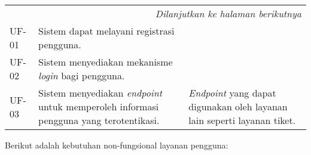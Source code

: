 \begin{longtable}{|l|p{}|p{}|}
    \hline
    \multicolumn{3}{|r|}{\textit{Dilanjutkan ke halaman berikutnya}}                                                                                                                                                                                                                                                                                                                                                                                                                                                                                                                                      \\
    \endfoot

    \hline
    \endlastfoot

    \hline
    UF-01       & Sistem dapat melayani registrasi pengguna.                                                                                                                                                                                      &                                                                                                                                                                                                                                                                                                                                                       \\
    \hline
    UF-02       & Sistem menyediakan mekanisme \textit{login} bagi pengguna.                                                                                                                                                                      &                                                                                                                                                                                                                                                                                                                                                       \\
    \hline
    UF-03       & Sistem menyediakan \textit{endpoint} untuk memperoleh informasi pengguna yang terotentikasi.                                                                                                                  & \textit{Endpoint} yang dapat digunakan oleh layanan lain seperti layanan tiket.  \\
\end{longtable}
\endgroup

Berikut adalah kebutuhan non-fungsional layanan pengguna:

